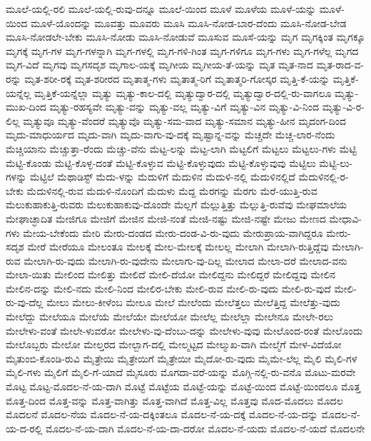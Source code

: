 {ಮೂಲೆ-ಯಲ್ಲಿ-ರಲಿ
ಮೂಲೆ-ಯಲ್ಲಿ-ರುವು-ದನ್ನೂ
ಮೂಲೆ-ಯಿಂದ
ಮೂಳೆ
ಮೂಳೆಯ
ಮೂಳೆ-ಯನ್ನು
ಮೂಳೆ-ಯಿಂದ
ಮೂಳೆ-ಯೊಂದನ್ನು
ಮೂವತ್ತು
ಮೂವರು
ಮೂಸಿ
ಮೂಸಿ-ನೋಡ-ಬಾರ-ದೆಂದು
ಮೂಸಿ-ನೋಡ-ಬೇಡ
ಮೂಸಿ-ನೋಡಲೇ-ಬೇಕು
ಮೂಸಿ-ನೋಡು
ಮೂಸಿ-ನೋಡುವೆ
ಮೂಸುವ
ಮೂಸೆ-ಯನ್ನು
ಮೃಗ
ಮೃಗಕ್ಕಿಂತ
ಮೃಗಕ್ಕೂ
ಮೃಗಕ್ಕೆ
ಮೃಗ-ಗಳ
ಮೃಗ-ಗಳನ್ನಾಗಿ
ಮೃಗ-ಗಳಲ್ಲಿ
ಮೃಗ-ಗಳಿ-ಗಿಂತ
ಮೃಗ-ಗಳಿಗೂ
ಮೃಗ-ಗಳು
ಮೃಗ-ಗಳೆಲ್ಲ
ಮೃಗದ
ಮೃಗ-ವಿದೆ
ಮೃಗವು
ಮೃಗಸದೃಶ
ಮೃಗಾಲ-ಯಕ್ಕೆ
ಮೃಗೀಯ
ಮೃಗೀಯ-ತೆ-ಯನ್ನು
ಮೃತ
ಮೃತ-ನಾದ
ಮೃತ-ರಾದ-ವ-ರನ್ನು
ಮೃತ-ಶರೀ-ರಕ್ಕೆ
ಮೃತ-ಶರೀರದ
ಮೃತಾತ್ಮ-ಗಳು
ಮೃತಾತ್ಮ-ರಿಗೆ
ಮೃತಾತ್ಮರಿ-ಗೋಸ್ಕರ
ಮೃತ್ತಿ-ಕೆ-ಯನ್ನು
ಮೃತ್ತಿಕೆ-ಯನ್ನೆಲ್ಲ
ಮೃತ್ತಿಕೆ-ಯನ್ನೆಲ್ಲಾ
ಮೃತ್ಯು
ಮೃತ್ಯು-ಕಾಲ-ದಲ್ಲಿ
ಮೃತ್ಯುದ್ವಾರ-ದಲ್ಲಿ
ಮೃತ್ಯುದ್ವಾರ-ದಲ್ಲಿ-ರು-ವಾಗಲೂ
ಮೃತ್ಯು-ಮುಖ-ದಿಂದ
ಮೃತ್ಯು-ರಹಸ್ಯವೇ
ಮೃತ್ಯು-ವನ್ನು
ಮೃತ್ಯು-ವಲ್ಲ
ಮೃತ್ಯು-ವಿಗೆ
ಮೃತ್ಯು-ವಿನ
ಮೃತ್ಯು-ವಿ-ನಿಂದ
ಮೃತ್ಯು-ವಿ-ರ-ಲಿಲ್ಲ
ಮೃತ್ಯುವೂ
ಮೃತ್ಯು-ವೆಂದರೆ
ಮೃತ್ಯುವೊ
ಮೃತ್ಯು-ಸಮ-ವಾದ
ಮೃತ್ಯು-ಸಮಾನ
ಮೃತ್ಯು-ಹೀನ
ಮೃದಂಗ-ದಿಂದ
ಮೃದು-ಮಾಧುರ್ಯದ
ಮೃದು-ವಾಗಿ
ಮೃದು-ವಾಗು-ವು-ದಕ್ಕೆ
ಮೃಷ್ಟಾನ್ನ-ವನ್ನು
ಮೆಚ್ಚದೇ
ಮೆಚ್ಚ-ಲಾರ-ನೆಂದು
ಮೆಚ್ಚಿಯಾನು
ಮೆಚ್ಚುತ್ತಾ-ರೆಂದು
ಮೆಚ್ಚು-ವೆನು
ಮೆಟ್ಟ-ಲನ್ನು
ಮೆಟ್ಟ-ಲಾಗಿ
ಮೆಟ್ಟಲಿಗೆ
ಮೆಟ್ಟಲು
ಮೆಟ್ಟಲು-ಗಳು
ಮೆಟ್ಟಿ
ಮೆಟ್ಟಿ-ಕೊಂಡು
ಮೆಟ್ಟಿ-ಕೊಳ್ಳ-ದಂತೆ
ಮೆಟ್ಟಿ-ಕೊಳ್ಳುವ
ಮೆಟ್ಟಿ-ಕೊಳ್ಳುವುದು
ಮೆಟ್ಟಿ-ಕೊಳ್ಳುವುವು
ಮೆಟ್ಟಿಲು
ಮೆಟ್ಟಿ-ಲು-ಗಳನ್ನು
ಮೆಟ್ಟಿಲೆ
ಮೆಥಾಡಿಸ್ಟ್
ಮೆದು-ಳನ್ನು
ಮೆದುಳಿಗೆ
ಮೆದುಳಿನ
ಮೆದುಳಿ-ನಲ್ಲಿ
ಮೆದುಳಿನಲ್ಲಿದೆ
ಮೆದುಳಿನಲ್ಲಿ-ರ-ಬೇಕು
ಮೆದುಳಿನಲ್ಲಿ-ರುವ
ಮೆದುಳಿ-ನೊಂದಿಗೆ
ಮೆದುಳು
ಮೆದ್ದ
ಮೆರಗನ್ನು
ಮೆರಗು
ಮೆರೆ-ಯುತ್ತಿ-ರುವ
ಮೆಲುಕುಹಾಕುತ್ತಿ-ರುವರು
ಮೆಲುಕುಹಾಕುವು-ದೊಂದೇ
ಮೆಲ್ಲಗೆ
ಮೆಲ್ಲುತ್ತಿತ್ತು
ಮೆಲ್ಲುತ್ತಿ-ರುವೆವು
ಮೇಘಮಾಲೆಯ
ಮೇಘಾಚ್ಛಾದಿತ
ಮೇಜಿಗೂ
ಮೇಜಿಗೆ
ಮೇಜಿನ
ಮೇಜಿ-ನಂತೆ
ಮೇಜಿ-ನಷ್ಟು
ಮೇಜಿ-ನಷ್ಟೇ
ಮೇಜು
ಮೇಣದ
ಮೇಧಾವಿ-ಗಳು
ಮೇಯ-ಬೇಕೆಂದು
ಮೇರಿ
ಮೇರು-ದಂಡದ
ಮೇರು-ದಂಡ-ವಿ-ರು-ವುದು
ಮೇರುಪ್ರಾಯ-ವಾಗಿದ್ದರೂ
ಮೇರು-ಸದೃಶ
ಮೇರೆ
ಮೇರೆಯೂ
ಮೇಲಂತೂ
ಮೇಲಕ್ಕೆ
ಮೇಲ-ಮೇಲಕ್ಕೆ
ಮೇಲಲ್ಲ
ಮೇಲಾಗಿ
ಮೇಲಾಗಿ-ರುತ್ತಿದ್ದೆವು
ಮೇಲಾಗಿ-ರುವ
ಮೇಲಾಗಿ-ರು-ವುದು
ಮೇಲಾಗಿ-ರು-ವುದೇನು
ಮೇಲಾಗು-ವು-ದಿಲ್ಲ
ಮೇಲಾದ
ಮೇಲಾ-ದರೆ
ಮೇಲಾದ-ವನು
ಮೇಲಾ-ಯಿತು
ಮೇಲಿಂದ
ಮೇಲಿತ್ತು
ಮೇಲಿದೆ
ಮೇಲಿ-ದೆಯೋ
ಮೇಲಿದ್ದನು
ಮೇಲಿದ್ದರೆ
ಮೇಲಿದ್ದವು
ಮೇಲಿನ
ಮೇಲಿನ-ದನ್ನು
ಮೇಲಿ-ನದು
ಮೇಲಿ-ನಿಂದ
ಮೇಲಿರ-ಬೇಕು
ಮೇಲಿ-ರುವ
ಮೇಲಿ-ರು-ವುದು
ಮೇಲಿ-ರು-ವುದೆ
ಮೇಲಿ-ರು-ವು-ದೆಲ್ಲ
ಮೇಲು
ಮೇಲು-ಕೀಳೆಂಬ
ಮೇಲೂ
ಮೇಲೆ
ಮೇಲೆಂದು
ಮೇಲೆತ್ತಲು
ಮೇಲೆತ್ತಿದ್ದ
ಮೇಲೆತ್ತು-ವುದು
ಮೇಲೆದ್ದು
ಮೇಲೆಯೂ
ಮೇಲೆಯೆ
ಮೇಲೆಯೇ
ಮೇಲೆಯೋ
ಮೇಲೆಲ್ಲ
ಮೇಲೆಲ್ಲಾ
ಮೇಲೇನೂ
ಮೇಲೇ-ರಲು
ಮೇಲೇಳು-ವಂತೆ
ಮೇಲೇ-ಳುವರೋ
ಮೇಲೇಳು-ವು-ದೆಂಬು-ದನ್ನು
ಮೇಲೇಳು-ವುವು
ಮೇಲೊಂದ-ರಂತೆ
ಮೇಲೊಂದು
ಮೇಲೊಬ್ಬರು
ಮೇಲೋ
ಮೇಲ್ತರದ
ಮೇಲ್ಬಾಗ-ದಲ್ಲಿ
ಮೇಲ್ಮಟ್ಟದ
ಮೇಲ್ಮುಖ-ವಾಗಿ
ಮೇಲ್ಮೆಗೆ
ಮೇಳ-ವಿದೆಯೋ
ಮೈತುಂಬಿ-ಕೊಂಡಿ-ರುವಿ
ಮೈತ್ರೇಯಿ
ಮೈತ್ರೇಯಿಗೆ
ಮೈತ್ರೇಯೀ
ಮೈದೋ-ರು-ವುದು
ಮೈಮೇ-ಲೆಲ್ಲ
ಮೈಲಿ
ಮೈಲಿ-ಗಳ
ಮೈಲಿ-ಗಳು
ಮೈಲಿಗೆ
ಮೈಲಿ-ಗೆ-ಯಾದೆ
ಮೈಸೂರು
ಮೊಗದಾ-ವರೆ-ಯನ್ನು
ಮೊಗ್ಗಿ-ನಲ್ಲಿ-ರು-ವನೊ
ಮೊಟು-ಮರವೇ
ಮೊಟ್ಟ
ಮೊಟ್ಟ-ಮೊದಲ-ನೆ-ಯ-ದಾಗಿ
ಮೊಟ್ಟೆ
ಮೊಟ್ಟೆಯ
ಮೊಟ್ಟೆ-ಯನ್ನು
ಮೊಟ್ಟೆ-ಯಿಂದ
ಮೊಟ್ಟೆ-ಯಿಂದಲೂ
ಮೊತ್ತ
ಮೊತ್ತ-ದಿಂದ
ಮೊತ್ತ-ವನ್ನು
ಮೊತ್ತ-ವಾಗಿತ್ತು
ಮೊತ್ತ-ವಾಗಿದೆ
ಮೊತ್ತ-ವಿಲ್ಲ
ಮೊತ್ತವು
ಮೊದ-ಮೊದಲು
ಮೊದಲ
ಮೊದಲನೆ
ಮೊದಲ-ನೆಯ
ಮೊದಲ-ನೆ-ಯ-ದಕ್ಕಿಂತಲೂ
ಮೊದಲ-ನೆ-ಯ-ದಕ್ಕೆ
ಮೊದಲ-ನೆ-ಯ-ದನ್ನು
ಮೊದಲ-ನೆ-ಯ-ದ-ರಲ್ಲಿ
ಮೊದಲ-ನೆ-ಯ-ದಾಗಿ
ಮೊದಲ-ನೆ-ಯ-ದಾ-ದರೋ
ಮೊದಲ-ನೆ-ಯದು
ಮೊದಲ-ನೆ-ಯದೆ
ಮೊದಲನೇ
}
